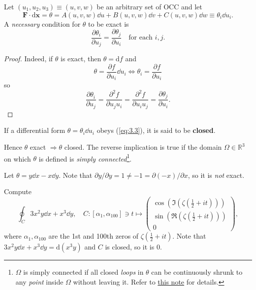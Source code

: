 \begin{proposition}
    Let $(u_1, u_2, u_3) \equiv (u, v, w)$ be an arbitrary set of OCC and let
    \[
        \mathbf{F} \cdot \mathrm{d}\mathbf{x} = \theta = A(u, v, w) \dd u + B(u, v, w) \dd v + C(u, v, w) \dd w \equiv \theta_i \dd u_i.
    \]
    A \textit{necessary} condition for $ \theta $ to be exact is
    \begin{equation}\label{eq:3.3}\tag{$\dagger$}
        \frac{\partial \theta_i}{\partial u_j}= \frac{\partial \theta_j}{\partial u_i}\quad \text{for each }i,j.  
    \end{equation}
\end{proposition}
\begin{proof}
    Indeed, if $ \theta $ is exact, then $ \theta=\mathrm{d} f $ and 
    \[
        \theta = \frac{\partial f}{\partial u_i}\dd u_i \Longleftrightarrow \theta_i = \frac{\partial f}{\partial u_i}  
    \]
    so 
    \[
        \frac{\partial \theta_i}{\partial u_j}= \frac{\partial^2 f}{\partial u_j u_i} =   \frac{\partial^2 f}{\partial u_i u_j} = \frac{\partial \theta_j}{\partial u_i}.
    \]
\end{proof}
\begin{definition}
    If a differential form $ \theta = \theta_i\dd u_i $ obeys (\ref{eq:3.3}), it is said to be \textbf{closed}.
\end{definition}
Hence $ \theta $ exact $ \Rightarrow \theta $ closed. The reverse implication is true if the domain $ \Omega\in \mathbb{R}^{3} $ on which $ \theta $ is defined is \textit{simply connected}\footnote{$ \Omega $ is simply connected if all closed \textit{loops} in $ \theta $ can be continuously shrunk to any \textit{point} inside $ \Omega $ without leaving it. Refer to \href{https://www.mv.helsinki.fi/home/pankka/deRham2013}{this note} for details.}.

\begin{example}
    Let $ \theta=y\dd x-x\dd y $. Note that $ \partial y/\partial y=1\neq -1=\partial (-x)/\partial x   $, so it is \textit{not} exact. 
\end{example}

\begin{example}
    Compute 
    \[
        \oint_C 3x^2y\dd x+x^3\dd y,\quad C:[\alpha_1,\alpha_{100}] \ni t \mapsto \begin{pmatrix}
            \cos \left(\Im\left(\zeta\left(\frac{1}{2}+it\right)\right)\right) \\ \sin \left(\Re\left(\zeta\left(\frac{1}{2}+it\right)\right)\right)  \\ 0
        \end{pmatrix},
    \]
    where $ \alpha_1,\alpha_{100} $ are the 1st and 100th zeros of $ \zeta(\frac{1}{2}+it) $. Note that $ 3x^2y\dd x+x^3\dd y=\mathrm{d}(x^3y) $ and $C$ is closed, so it is 0.
\end{example}


